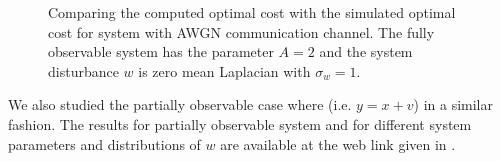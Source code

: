 \documentclass[12pt]{caltech_thesis_finalreport}
\begin{document}
		\begin{figure}[H]
			  \centering
			  \resizebox{15cm}{!}{}
			  \caption{Comparing the computed optimal cost with the simulated optimal cost for system with AWGN communication channel. The fully observable system has the parameter $A = 2$ and the system disturbance $w$ is zero mean Laplacian with $\sigma_{w} = 1$.}
			 \label{lowerbound_vs_laplace}
		\end{figure}	
		We also studied the partially observable case where (i.e. $y = x + v$) in a similar fashion. The results for partially observable system and for different system parameters and distributions of $w$ are available at the web link given in \cite{git}.
		
\end{document}
